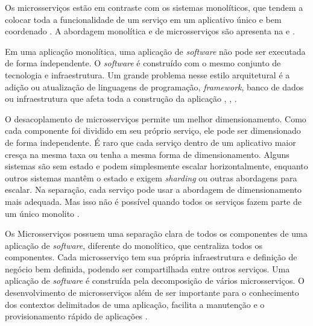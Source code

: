 
Os microsserviços estão em contraste com os sistemas monolíticos, que tendem a colocar toda a funcionalidade de um serviço em um aplicativo único e bem coordenado \cite{Burns2018DesigningServices}. A abordagem monolítica e de microsserviços são apresenta na  e .



Em uma aplicação monolítica, uma aplicação de \textit{software} não pode ser executada de forma independente. O \textit{software} é construído com o mesmo conjunto de tecnologia e infraestrutura. Um grande problema nesse estilo arquitetural é a adição ou atualização de linguagens de programação, \textit{framework}, banco de dados ou infraestrutura que afeta toda a construção da aplicação \cite{Burns2018DesigningServices}, \cite{Dragoni2016}, \cite{Martins2017}.
 
O desacoplamento de microsserviços permite um melhor dimensionamento. Como cada componente foi dividido em seu próprio serviço, ele pode ser dimensionado de forma independente. É raro que cada serviço dentro de um aplicativo maior cresça na mesma taxa ou tenha a mesma forma de dimensionamento. Alguns sistemas são sem estado e podem simplesmente escalar horizontalmente, enquanto outros sistemas mantêm o estado e exigem \textit{sharding} ou outras abordagens para escalar. Na separação, cada serviço pode usar a abordagem de dimensionamento mais adequada. Mas isso não é possível quando todos os serviços fazem parte de um único monolito \cite{Burns2018DesigningServices}.
 
Os Microsserviços possuem uma separação clara de todos os componentes de uma aplicação de \textit{software}, diferente do monolítico, que centraliza todos os componentes. Cada microsserviço tem sua própria infraestrutura e definição de negócio bem definida, podendo ser compartilhada entre outros serviços. Uma aplicação de \textit{software} é construída pela decomposição de vários microsserviços. O desenvolvimento de microsserviços além de ser importante para o conhecimento dos contextos delimitados de uma aplicação, facilita a manutenção e o provisionamento rápido de aplicações \cite{Burns2018DesigningServices}.

